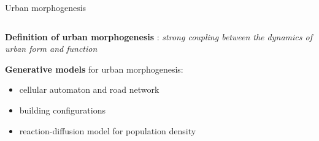 \documentclass{beamer}
\begin{document}
\begin{frame}{}
\begin{columns}[t]
\begin{column}{.49\textwidth}
         \begin{block}{Urban morphogenesis}

        \begin{columns}[t]
        \begin{column}{.95\textwidth}
        \vspace{-2cm}
        
          \textbf{Definition of urban morphogenesis} \cite{raimbault2018caracterisation}: \textit{strong coupling between the dynamics of urban form and function}
          
          \bigskip
          
          \textbf{Generative models} for urban morphogenesis:
          
          \begin{itemize}
          		\item cellular automaton and road network \cite{raimbault2014hybrid}
          		\item building configurations \cite{raimbault2019generating}
          		\item reaction-diffusion model for population density \cite{raimbault2018calibration}
          \end{itemize}


\end{column}
\end{columns}
\end{block}
\end{column}
\end{columns}
\end{frame}
\end{document}
